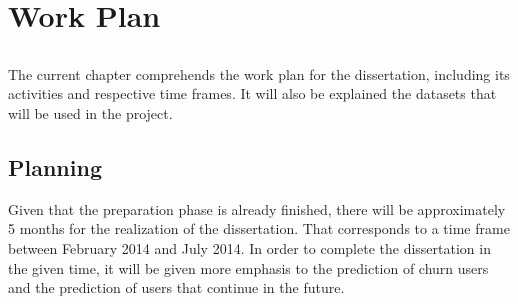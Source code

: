 \chapter{Work Plan}\label{chap:chap3}

\section*{}

The current chapter comprehends the work plan for the dissertation, including its activities and respective time frames.
It will also be explained the datasets that will be used in the project.

\section{Planning}

Given that the preparation phase is already finished, there will be approximately 5 months for the realization of the dissertation.
That corresponds to a time frame between February 2014 and July 2014. In order to complete the dissertation in the given time, it will be given more emphasis to the
prediction of churn users and the prediction of users that continue in the future.



